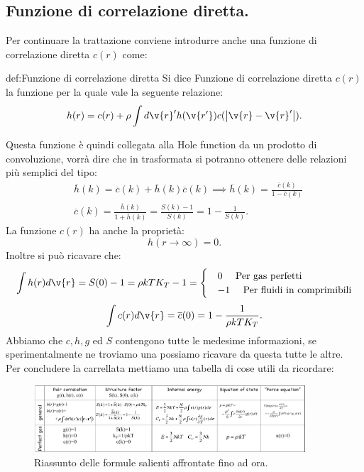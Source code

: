 \subsection{Funzione di correlazione diretta.}
\label{subsec:Funzione di correlazione diretta.}
Per continuare la trattazione conviene introdurre anche una funzione di correlazione diretta $c(r)$ come:
\begin{defn}{def:Funzione di correlazione diretta}
	Si dice Funzione di correlazione diretta $c(r)$ la funzione per la quale vale la   
	seguente relazione:
	\[
		h(r) = 
		c(r) 
		+
		\rho \int d \v{r}'h(\v{r'})c(\left| \v{r}-\v{r}' \right| )
	.\] 
\end{defn}
Questa funzione è quindi collegata alla Hole function da un prodotto di convoluzione, vorrà dire che in trasformata si potranno ottenere delle relazioni più semplici del tipo:
\[\begin{aligned}
	&\overline{h}(k) = \overline{c}(k) + \overline{h}(k) \overline{c}(k) 
	\implies \overline{h}(k) = \frac{\overline{c}(k)}{1-\overline{c}(k)}\\
	&\overline{c}(k) = \frac{\overline{h}(k)}{1 + \overline{h}(k)}=
	\frac{S(k)-1}{S(k)} = 1 - \frac{1}{S(k)}
.\end{aligned}\]
La funzione $c(r)$ ha anche la proprietà:
\[
	h(r\to \infty) = 0
.\]
Inoltre si può ricavare che:
\[
	\int h(r)d \v{r} = S(0)-1 = \rho kT K_T -1 = 
	\begin{cases}
		&0 \quad \text{ Per gas perfetti}\\
		&-1 \quad \text{ Per fluidi in comprimibili}
	\end{cases}
\] 
\[
	\int c(r)d \v{r} = \overline{c}(0)= 1- \frac{1}{\rho kTK_T}
.\] 
Abbiamo che $c,h,g$ ed $S$ contengono tutte le medesime informazioni, se sperimentalmente ne troviamo una possiamo ricavare da questa tutte le altre.\\
Per concludere la carrellata mettiamo una tabella di cose utili da ricordare:
\begin{figure}[H]
	\centering
	\includegraphics[width=0.9\textwidth]{figures/riassuntone-lez3-liquidi.png}
	\caption{Riassunto delle formule salienti affrontate fino ad ora.}
	\label{fig:figures-riassuntone-lez3-liquidi-png}
\end{figure}
